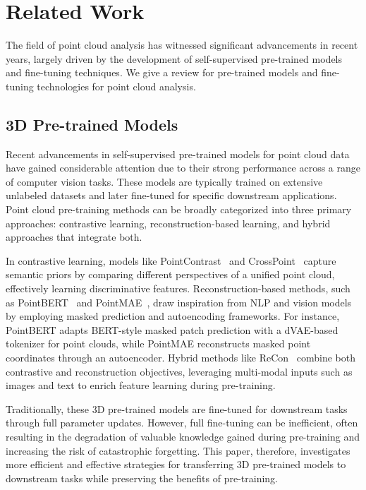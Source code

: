 \section{Related Work}
\label{sec:relatedwork}
The field of point cloud analysis has witnessed significant advancements in recent years, largely driven by the development of self-supervised pre-trained models and fine-tuning techniques. We give a review for pre-trained models and fine-tuning technologies for point cloud analysis.

\subsection{3D Pre-trained Models}
Recent advancements in self-supervised pre-trained models for point cloud data have gained considerable attention due to their strong performance across a range of computer vision tasks. These models are typically trained on extensive unlabeled datasets and later fine-tuned for specific downstream applications. Point cloud pre-training methods can be broadly categorized into three primary approaches: contrastive learning, reconstruction-based learning, and hybrid approaches that integrate both.

In contrastive learning, models like PointContrast~\cite{xie2020pointcontrast} and CrossPoint~\cite{afham2022crosspoint} capture semantic priors by comparing different perspectives of a unified point cloud, effectively learning discriminative features. Reconstruction-based methods, such as PointBERT~\cite{yu2022point} and PointMAE~\cite{pang2022masked}, draw inspiration from NLP and vision models by employing masked prediction and autoencoding frameworks. For instance, PointBERT adapts BERT-style masked patch prediction with a dVAE-based tokenizer for point clouds, while PointMAE reconstructs masked point coordinates through an autoencoder. Hybrid methods like ReCon~\cite{qi2023contrast} combine both contrastive and reconstruction objectives, leveraging multi-modal inputs such as images and text to enrich feature learning during pre-training.

Traditionally, these 3D pre-trained models are fine-tuned for downstream tasks through full parameter updates. However, full fine-tuning can be inefficient, often resulting in the degradation of valuable knowledge gained during pre-training and increasing the risk of catastrophic forgetting. This paper, therefore, investigates more efficient and effective strategies for transferring 3D pre-trained models to downstream tasks while preserving the benefits of pre-training.

